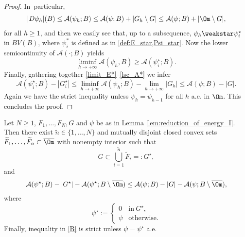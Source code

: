 \begin{proof}
In~particular,
\begin{equation*}
|D\psi_{h}|(B)\le\mathcal{A}(\psi_{h};B)\le \mathcal{A}(\psi;B)+|G_{h}\setminus G|\le \mathcal{A}(\psi;B)+|\Om\setminus G|,
\end{equation*}
for all $h\ge1$, and then we easily see that, up to a subsequence, $\psi_{h}\weakstar\psi^\star_i$ in $BV(B)$, where $\psi_i^*$ is defined as in \eqref{def:E_star,Psi_star}.
Now the lower semicontinuity of $\mathcal{A}(\cdot;B)$ yields
\begin{equation}\label{lsc_A*}
\liminf_{h\to+\infty}\mathcal{A}(\psi_{h},B)\ge
\mathcal{A}(\psi_i^\star;B).
\end{equation}
Finally, gathering together \eqref{limit_E*}--\eqref{lsc_A*} we infer
\begin{equation*}
\mathcal{A}(\psi_i^\star;B)-|G^\star_i|\le
\liminf_{h\to+\infty}\mathcal{A}(\psi_{h};B)-\lim_{h\to+\infty}|G_{h}|\le
\mathcal{A}(\psi;B)-|G|.
\end{equation*}
Again we have the strict inequality unless $\psi_h=\psi_{h-1}$ for all $h$ a.e. in $\Om$.
This concludes the proof.
\end{proof}

\begin{lemma}
\label{lem:reduction_of_energy_II}
Let $N\ge 1$, $F_1,\dots,F_N,G$ and $\psi$ be
as in Lemma \ref{lem:reduction_of_energy_I}.
Then there exist $\tilde n \in \{1, \dots, N\}$ and mutually disjoint closed convex sets $\widetilde F_1,\dots,\widetilde F_{\tilde n}\subset\overline\Om$ with nonempty interior
such that
\begin{equation}\label{A}
G\subset \bigcup_{i=1}^{\tilde n}\widetilde F_i=:G^\star,
\end{equation}
and
\begin{equation}\label{B}
\mathcal{A}(\psi^\star;B)-|G^\star|-\mathcal{A}(\psi^\star;B\setminus \overline\Om)\le \mathcal A(\psi; B)-|G|-\mathcal{A}(\psi;B\setminus\overline{\Om}),
\end{equation}
where
\begin{equation}\label{C}
\psi^\star:=\begin{cases}
0&\text{in}\ G^\star,\\
\psi&\text{otherwise}.
\end{cases}
\end{equation}
Finally, inequality in \eqref{B} is strict unless $\psi=\psi^\star$ a.e.
\end{lemma}

